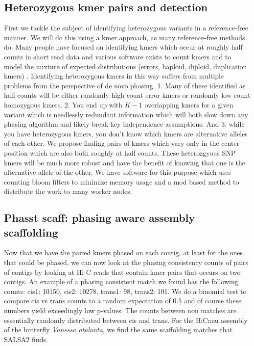 {\subsection{Heterozygous kmer pairs and detection}
\par{
First we tackle the subject of identifying heterozygous variants in a reference-free manner. We will do this using a kmer approach, as many reference-free methods do. 
Many people have focused on identifying kmers which occur at roughly half counts in short read data \cite{KAT} and various software exists to count kmers \cite{jellyfish} 
and to model the mixture of expected distributions (errors, haploid, diploid, duplication kmers) \cite{genomescope}. Identifying heterozygous kmers in this way 
suffers from multiple problems from the perspective of de novo phasing. 1. Many of these identified as half counts will be either randomly high count error kmers or randomly low count 
homozygous kmers. 2. You end up with $K-1$ overlapping kmers for a given variant which is needlessly redundant information which will both slow down any phasing algorithm and 
likely break key independence assumptions. And 3. while you have heterozygous kmers, you don't know which kmers are alternative alleles of each other. 
We propose finding pairs of kmers which vary only in the center position which are also both roughly at half counts. These heterozgyous SNP kmers 
will be much more robust and have the benefit of knowing that one is the alternative allele of the other.
We have software for this purpose \cite{het_kmers} which uses counting bloom filters to minimize memory usage and a mod based method to 
distribute the work to many worker nodes.
}

\subsection{Phasst scaff: phasing aware assembly scaffolding}

\par{
Now that we have the paired kmers phased on each contig, at least for the ones that could be phased, we can now look at the phasing consistency counts of pairs of contigs by looking at Hi-C reads that contain kmer pairs that occurs on two contigs. An example of a phasing consistent match we found has the following counts:  cis1: 10150, cis2: 10278, trans1: 98, trans2: 101. We do a binomial test to compare cis vs trans counts to a random expectation of 0.5 and of course these numbers yield exceedingly low p-values. The counts between non matches are essentially randomly distributed between cis and trans. For the HiCanu assembly of the butterfly \textit{Vanessa atalanta}, we find the same scaffolding matches that SALSA2 finds.
}

}
